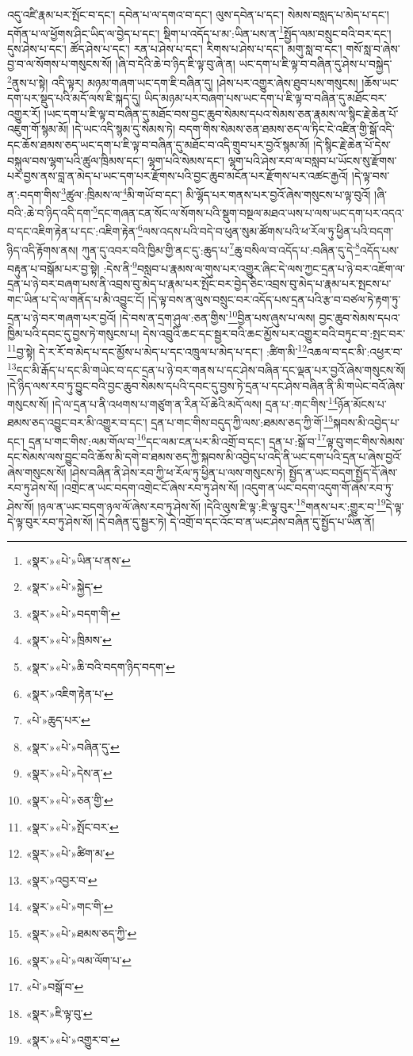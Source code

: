 འདུ་འཛི་རྣམ་པར་སྤོང་བ་དང་། དབེན་པ་ལ་དགའ་བ་དང་། ལུས་དབེན་པ་དང་། སེམས་བསླད་པ་མེད་པ་དང་། དགོན་པ་ལ་ཕྱོགས་ཤིང་ཡིད་ལ་བྱེད་པ་དང་། སྡིག་པ་འདོད་པ་མ་:ཡིན་པས་ན་\footnote{«སྣར་»«པེ་»ཡིན་པ་ནས་}སྤྱོད་ལམ་བསྲུང་བའི་བར་དང་། དུས་ཤེས་པ་དང་། ཚོད་ཤེས་པ་དང་། རན་པ་ཤེས་པ་དང་། རིགས་པ་ཤེས་པ་དང་། མགུ་སླ་བ་དང་། གསོ་སླ་བ་ཞེས་བྱ་བ་ལ་སོགས་པ་གསུངས་སོ། །ཞི་བ་དེའི་ཆེ་བ་ཉིད་ཇི་ལྟ་བུ་ཞེ་ན། ཡང་དག་པ་ཇི་ལྟ་བ་བཞིན་དུ་ཤེས་པ་བསྐྱེད་\footnote{«སྣར་»«པེ་»སྐྱེད་}ནུས་པ་སྟེ། འདི་ལྟར། མཉམ་གཞག་ཡང་དག་ཇི་བཞིན་དུ། །ཤེས་པར་འགྱུར་ཞེས་ཐུབ་པས་གསུངས། །ཆོས་ཡང་དག་པར་སྡུད་པའི་མདོ་ལས་ཇི་སྐད་དུ། ཡིད་མཉམ་པར་བཞག་པས་ཡང་དག་པ་ཇི་ལྟ་བ་བཞིན་དུ་མཐོང་བར་འགྱུར་རོ། །ཡང་དག་པ་ཇི་ལྟ་བ་བཞིན་དུ་མཐོང་བས་བྱང་ཆུབ་སེམས་དཔའ་སེམས་ཅན་རྣམས་ལ་སྙིང་རྗེ་ཆེན་པོ་འཇུག་གོ་སྙམ་མོ། །དེ་ཡང་འདི་སྙམ་དུ་སེམས་ཏེ། བདག་གིས་སེམས་ཅན་ཐམས་ཅད་ལ་ཏིང་ངེ་འཛིན་གྱི་སྒོ་འདི་དང་ཆོས་ཐམས་ཅད་ཡང་དག་པ་ཇི་ལྟ་བ་བཞིན་དུ་མཐོང་བ་འདི་གྲུབ་པར་བྱའོ་སྙམ་མོ། །དེ་སྙིང་རྗེ་ཆེན་པོ་དེས་བསྐུལ་བས་ལྷག་པའི་ཚུལ་ཁྲིམས་དང་། ལྷག་པའི་སེམས་དང་། ལྷག་པའི་ཤེས་རབ་ལ་བསླབ་པ་ཡོངས་སུ་རྫོགས་པར་བྱས་ནས་བླ་ན་མེད་པ་ཡང་དག་པར་རྫོགས་པའི་བྱང་ཆུབ་མངོན་པར་རྫོགས་པར་འཚང་རྒྱའོ། །དེ་ལྟ་བས་ན་:བདག་གིས་\footnote{«སྣར་»«པེ་»བདག་གི་}ཚུལ་:ཁྲིམས་ལ་\footnote{«སྣར་»«པེ་»ཁྲིམས་}མི་གཡོ་བ་དང་། མི་ལྷོད་པར་གནས་པར་བྱའོ་ཞེས་གསུངས་པ་ལྟ་བུའོ། །ཞི་བའི་:ཆེ་བ་ཉིད་འདི་དག་\footnote{«སྣར་»«པེ་»ཆི་བའི་བདག་ཉིད་བདག་}དང་གཞན་ངན་སོང་ལ་སོགས་པའི་སྡུག་བསྔལ་མཐའ་ཡས་པ་ལས་ཡང་དག་པར་འདའ་བ་དང་འཇིག་རྟེན་པ་དང་:འཇིག་རྟེན་\footnote{«སྣར་»འཇིག་རྟེན་པ་}ལས་འདས་པའི་བདེ་བ་ཕུན་སུམ་ཚོགས་པའི་ཕ་རོལ་ཏུ་ཕྱིན་པའི་བདག་ཉིད་འདི་རྟོགས་ནས། ཀུན་དུ་འབར་བའི་ཁྱིམ་གྱི་ནང་དུ་:ཆུད་པ་\footnote{«པེ་»ཆུད་པར་}ཆུ་བསིལ་བ་འདོད་པ་:བཞིན་དུ་དེ་\footnote{«སྣར་»«པེ་»བཞིན་དུ་}འདོད་པས་བརྟུན་པ་བསྒོམ་པར་བྱ་སྟེ། :དེས་ནི་\footnote{«སྣར་»«པེ་»དེས་ན་}བསླབ་པ་རྣམས་ལ་གུས་པར་འགྱུར་ཞིང་དེ་ལས་ཀྱང་དྲན་པ་ཉེ་བར་འཇོག་ལ་དྲན་པ་ཉེ་བར་བཞག་པས་ནི་འབྲས་བུ་མེད་པ་རྣམ་པར་སྤོང་བར་བྱེད་ཅིང་འབྲས་བུ་མེད་པ་རྣམ་པར་སྤངས་པ་གང་ཡིན་པ་དེ་ལ་གནོད་པ་མི་འབྱུང་ངོ། །དེ་ལྟ་བས་ན་ལུས་བསྲུང་བར་འདོད་པས་དྲན་པའི་རྩ་བ་བཙལ་ཏེ་རྟག་ཏུ་དྲན་པ་ཉེ་བར་གཞག་པར་བྱའོ། །དེ་བས་ན་དྲག་ཤུལ་:ཅན་གྱིས་\footnote{«སྣར་»«པེ་»ཅན་གྱི་}བྱིན་པས་ཞུས་པ་ལས། བྱང་ཆུབ་སེམས་དཔའ་ཁྱིམ་པའི་དབང་དུ་བྱས་ཏེ་གསུངས་པ། དེས་འབྲུའི་ཆང་དང་སྦྱར་བའི་ཆང་མྱོས་པར་འགྱུར་བའི་བཏུང་བ་:སྤང་བར་\footnote{«སྣར་»«པེ་»སྤོང་བར་}བྱ་སྟེ། དེ་ར་རོ་བ་མེད་པ་དང་མྱོས་པ་མེད་པ་དང་འཁྲུལ་པ་མེད་པ་དང་། :ཚིག་མི་\footnote{«སྣར་»«པེ་»ཚིག་མ་}འཆལ་བ་དང་མི་:འཕྱར་བ་\footnote{«སྣར་»འབྱར་བ་}དང་མི་རྒོད་པ་དང་མི་གཡེང་བ་དང་དྲན་པ་ཉེ་བར་གནས་པ་དང་ཤེས་བཞིན་དང་ལྡན་པར་བྱའོ་ཞེས་གསུངས་སོ། །དེ་ཉིད་ལས་རབ་ཏུ་བྱུང་བའི་བྱང་ཆུབ་སེམས་དཔའི་དབང་དུ་བྱས་ཏེ་དྲན་པ་དང་ཤེས་བཞིན་ནི་མི་གཡེང་བའོ་ཞེས་གསུངས་སོ། །དེ་ལ་དྲན་པ་ནི་འཕགས་པ་གཙུག་ན་རིན་པོ་ཆེའི་མདོ་ལས། དྲན་པ་:གང་གིས་\footnote{«སྣར་»«པེ་»གང་གི་}ཉོན་མོངས་པ་ཐམས་ཅད་འབྱུང་བར་མི་འགྱུར་བ་དང་། དྲན་པ་གང་གིས་བདུད་ཀྱི་ལས་:ཐམས་ཅད་ཀྱི་གོ་\footnote{«སྣར་»«པེ་»ཐམས་ཅད་ཀྱི་}སྐབས་མི་འབྱེད་པ་དང་། དྲན་པ་གང་གིས་:ལམ་གོལ་བ་\footnote{«སྣར་»«པེ་»ལམ་ལོག་པ་}དང་ལམ་ངན་པར་མི་འགྲོ་བ་དང་། དྲན་པ་:སྒོ་བ་\footnote{«པེ་»བསྒོ་བ་}ལྟ་བུ་གང་གིས་སེམས་དང་སེམས་ལས་བྱུང་བའི་ཆོས་མི་དགེ་བ་ཐམས་ཅད་ཀྱི་སྐབས་མི་འབྱེད་པ་འདི་ནི་ཡང་དག་པའི་དྲན་པ་ཞེས་བྱའོ་ཞེས་གསུངས་སོ། །ཤེས་བཞིན་ནི་ཤེས་རབ་ཀྱི་ཕ་རོལ་ཏུ་ཕྱིན་པ་ལས་གསུངས་ཏེ། སྤྱོད་ན་ཡང་བདག་སྤྱོད་དོ་ཞེས་རབ་ཏུ་ཤེས་སོ། །འགྲེང་ན་ཡང་བདག་འགྲེང་ངོ་ཞེས་རབ་ཏུ་ཤེས་སོ། །འདུག་ན་ཡང་བདག་འདུག་གོ་ཞེས་རབ་ཏུ་ཤེས་སོ། །ཉལ་ན་ཡང་བདག་ཉལ་ལོ་ཞེས་རབ་ཏུ་ཤེས་སོ། །དེའི་ལུས་ཇི་ལྟ་:ཇི་ལྟ་བུར་\footnote{«སྣར་»ཇི་ལྟ་བུ་}གནས་པར་:གྱུར་བ་\footnote{«སྣར་»«པེ་»འགྱུར་བ་}དེ་ལྟ་དེ་ལྟ་བུར་རབ་ཏུ་ཤེས་སོ། །དེ་བཞིན་དུ་སྦྱར་ཏེ། དེ་འགྲོ་བ་དང་འོང་བ་ན་ཡང་ཤེས་བཞིན་དུ་སྤྱོད་པ་ཡིན་ནོ། 